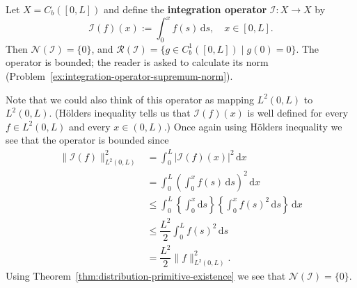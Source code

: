 \begin{Example}
\label{ex:integration-operator-fixed-lower-endpoint}
Let $X=C_b([0,L])$ and define the \textbf{integration operator} $\mathcal{I}:X\to X$ by
\begin{equation}\label{eq:integration-operator-fixed-lower-endpoint}
\mathcal{I}(f)(x):=\int_0^xf(s)\,\mathrm{d}s,\quad x\in[0,L].
\end{equation}
Then $\mathcal{N}(\mathcal{I})=\{0\}$, and $\mathcal{R}(\mathcal{I})=\{g\in C_b^1([0,L])\mid g(0)=0\}$. The operator is bounded; the reader is asked to calculate its norm (Problem~\ref{ex:integration-operator-supremum-norm}).

Note that we could also think of this operator as mapping $L^2(0,L)$ to $L^2(0,L)$. (Hölder\textquotesingle s inequality tells us that $\mathcal{I}(f)(x)$ is well defined for every $f\in L^2(0,L)$ and every $x\in(0,L)$.) Once again using Hölder\textquotesingle s inequality we see that the operator is bounded since\[\begin{aligned}
\|\mathcal{I}(f)\|_{L^2(0,L)}^2&=\int_0^L|\mathcal{I}(f)(x)|^2\,\mathrm{d}x\\
&=\int_0^L\left(\int_0^xf(s)\,\mathrm{d}s\right)^2\,\mathrm{d}x\\
&\leq\int_0^L\left\{\int_0^x\mathrm{d}s\right\}\left\{\int_0^xf(s)^2\,\mathrm{d}s\right\}\,\mathrm{d}x\\
&\leq\dfrac{L^2}{2}\int_0^Lf(s)^2\,\mathrm{d}s\\
&=\dfrac{L^2}{2}\|f\|_{L^2(0,L)}^2.
\end{aligned}\]Using Theorem~\ref{thm:distribution-primitive-existence} we see that $\mathcal{N}(\mathcal{I})=\{0\}$.
\end{Example}

